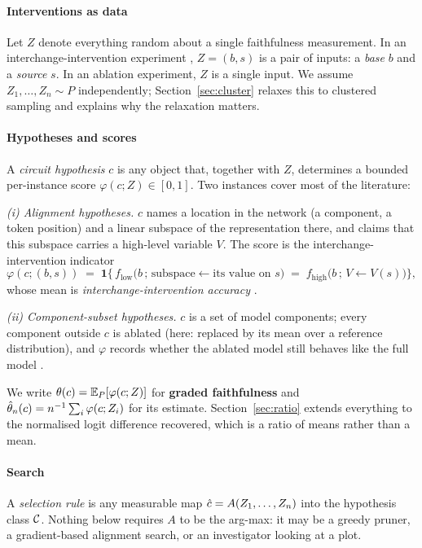 \paragraph{Interventions as data}
Let $Z$ denote everything random about a single faithfulness measurement. In an
interchange-intervention experiment \citep{geiger2021causalabstractions},
$Z=(b,s)$ is a pair of inputs: a \emph{base} $b$ and a \emph{source} $s$. In an
ablation experiment, $Z$ is a single input. We assume
$Z_1,\dots,Z_n \sim P$ independently; Section~\ref{sec:cluster} relaxes this to
clustered sampling and explains why the relaxation matters.

\paragraph{Hypotheses and scores}
A \emph{circuit hypothesis} $c$ is any object that, together with $Z$, determines
a bounded per-instance score $\varphi(c;Z)\in[0,1]$. Two instances cover most of
the literature:

\emph{(i) Alignment hypotheses.} $c$ names a location in the network (a
component, a token position) and a linear subspace of the representation there,
and claims that this subspace carries a high-level variable $V$. The score is
the interchange-intervention indicator
\[
\varphi(c;(b,s)) \;=\; \mathbf{1}\Big\{\, f_{\mathrm{low}}\big(b \,;\, \text{subspace} \leftarrow \text{its value on } s\big)
\;=\; f_{\mathrm{high}}\big(b \,;\, V \leftarrow V(s)\big) \Big\},
\]
whose mean is \emph{interchange-intervention accuracy}
\citep{geiger2022inducing,geiger2024finding,wu2023interpretability}.

\emph{(ii) Component-subset hypotheses.} $c$ is a set of model components; every
component outside $c$ is ablated (here: replaced by its mean over a reference
distribution), and $\varphi$ records whether the ablated model still behaves like
the full model \citep{wang2023interpretability,conmy2023towards,chan2022causal}.

We write $\theta(c)=\mathbb{E}_P[\varphi(c;Z)]$ for \textbf{graded faithfulness} and
$\hat{\theta}_n(c)=n^{-1}\sum_i \varphi(c;Z_i)$ for its estimate. Section~\ref{sec:ratio}
extends everything to the normalised logit difference recovered, which is a ratio
of means rather than a mean.

\paragraph{Search}
A \emph{selection rule} is any measurable map $\hat{c}=A(Z_1,\dots,Z_n)$ into the
hypothesis class $\mathcal{C}$. Nothing below requires $A$ to be the arg-max: it may
be a greedy pruner, a gradient-based alignment search, or an investigator looking
at a plot.


